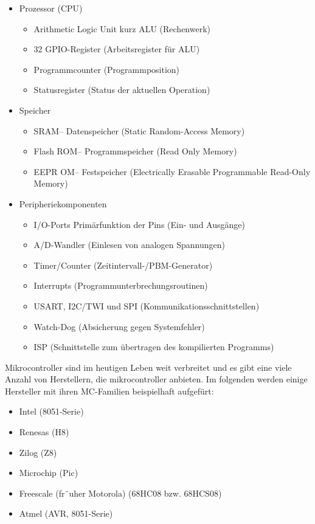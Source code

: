 \begin{itemize}
\item Prozessor (CPU)
\begin{itemize}
          \item Arithmetic Logic Unit kurz ALU (Rechenwerk)
          \item 32 GPIO-Register (Arbeitsregister f\"ur ALU)
          \item Programmcounter (Programmposition)
					\item Statusregister (Status der aktuellen Operation) 
\end{itemize}
\item Speicher
\begin{itemize}
          \item SRAM– Datenspeicher (Static Random-Access Memory)
					\item Flash ROM– Programmspeicher (Read Only Memory)
					\item EEPR OM– Festspeicher (Electrically Erasable Programmable Read-Only Memory)
\end{itemize}
\item Peripheriekomponenten
    \begin{itemize}
          \item I/O-Ports Prim\"arfunktion der Pins (Ein- und Ausg\"ange)
          \item A/D-Wandler (Einlesen von analogen Spannungen)
          \item Timer/Counter (Zeitintervall-/PBM-Generator)
					\item Interrupts (Programmunterbrechungsroutinen)
					\item USART, I2C/TWI und SPI (Kommunikationsschnittstellen)
					\item Watch-Dog (Absicherung gegen Systemfehler)
					\item ISP (Schnittstelle zum \"{u}bertragen des kompilierten Programms)
	\end{itemize}
\end{itemize}
Mikrocontroller sind im heutigen Leben weit verbreitet und es gibt eine viele Anzahl von Herstellern, die mikrocontroller anbieten. Im folgenden werden einige Hersteller mit ihren MC-Familien beispielhaft aufgef\"urt:
\begin{itemize}
\item Intel (8051-Serie)
\item Renesas (H8)
\item Zilog (Z8)
\item Microchip (Pic)
\item Freescale (fr¨uher Motorola) (68HC08 bzw. 68HCS08)
\item Atmel (AVR, 8051-Serie)
\end{itemize}
